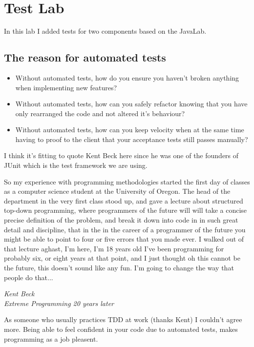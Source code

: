 \section{Test Lab}

In this lab I added tests for two components based on the JavaLab.

\subsection{The reason for automated tests}
\begin{itemize}
        \item Without automated tests, how do you ensure you haven't broken
                anything when implementing new features?
        \item Without automated tests, how can you safely refactor knowing that you have only
                rearranged the code and not altered it's behaviour?
        \item Without automated tests, how can you keep velocity when at the
                same time having to proof to the client that your acceptance
                tests still passes manually?
\end{itemize}
I think it's fitting to quote Kent Beck \cite{kent-beck-xp-history} here since he was one of the founders of
JUnit which is the test framework we are using.

\epigraph{So my experience with programming methodologies started the first day of classes as a computer
science student at the University of Oregon.
The head of the department in the very first class stood up, and gave a
lecture about structured top-down programming, where programmers of the
future will will take a concise precise definition of the problem, and break it
down into code in in such great detail and discipline, that in the in the career
of a programmer of the future you might be able to point to four or five errors
that you made ever. I walked out of that lecture aghast, I'm here, I'm 18
years old I've been programming for probably six, or eight years at that
point, and I just thought oh this cannot be the future, this doesn't sound like
any fun. I'm going to change the way that
people do that...}{\textit{Kent Beck \\ Extreme Programming 20 years later
}}

As someone who usually practices TDD at work (thanks Kent) I couldn't agree
more. Being able to feel confident in your code due to automated tests, makes
programming as a job pleasent.


